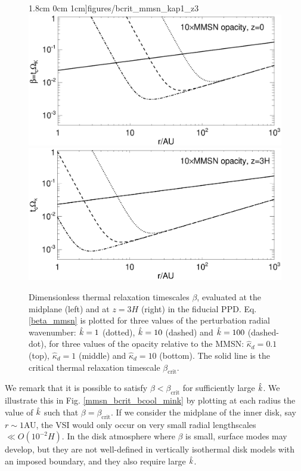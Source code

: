 {\begin{figure}
  1.8cm 0cm 1cm]{figures/bcrit_mmsn_kap1_z3}\\
  \includegraphics[scale=.47,clip=true,trim=0cm 0cm 0cm
  1cm]{figures/bcrit_mmsn_kap10_z0}\includegraphics[scale=.47,clip=true,trim=2.5cm 0cm 0cm
  1cm]{figures/bcrit_mmsn_kap10_z3} 
  \caption{Dimensionless thermal relaxation timescales $\beta$,
    evaluated at the midplane (left) and at $z=3H$ (right) in the
    fiducial PPD. Eq. \ref{beta_mmsn} is plotted  
    for three values of the 
    perturbation radial wavenumber: $\hat{k}=1$ (dotted), $\hat{k}=10$
    (dashed) and $\hat{k}=100$ (dashed-dot), for three values of the
    opacity relative to the MMSN: $\hat{\kappa}_d=0.1$ (top),
    $\hat{\kappa}_d=1$ (middle) and $\hat{\kappa}_d=10$ (bottom).  
    The solid line is the 
    critical thermal relaxation timescale $\beta_\mathrm{crit}$.  
    \label{mmsn_bcrit_bcool}}   
\end{figure}  

We remark that it is possible to satisfy $\beta < \beta_\mathrm{crit}$ 
for sufficiently large $\hat{k}$. We illustrate this in 
Fig. \ref{mmsn_bcrit_bcool_mink} by plotting at each radius the value
of $\hat{k}$ such that $\beta = \beta_\mathrm{crit}$. If we consider the
midplane of the inner disk, say $r\sim 1$AU, the VSI would only occur
on very small radial lengthscales $\ll O(10^{-2}H)$. In the disk
atmosphere where $\beta$ is small, surface modes may develop, 
but they are not well-defined in vertically isothermal disk models
with an imposed boundary, and they also require large $\hat{k}$.    

}
